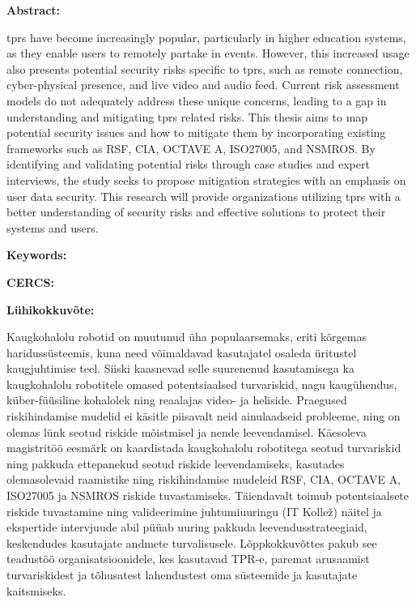 
\newpage
\noindent\textbf{\large {\thesisTitle}}

\vspace*{3ex}

\noindent\textbf{Abstract:}
\vspace{-1ex}

\ac{tprs} have become increasingly popular, particularly
in higher education systems, as they enable users to remotely partake in
events. However, this increased usage also presents potential security risks
specific to \ac{tprs}, such as remote connection, cyber-physical presence, and
live video and audio feed. Current risk assessment models do not adequately
address these unique concerns, leading to a gap in understanding and
mitigating \ac{tprs} related risks.
This thesis aims to map potential security issues and how to mitigate them by incorporating existing
frameworks such as RSF, CIA, OCTAVE A, ISO27005, and NSMROS. By identifying and validating
potential risks through case studies and expert interviews, the study seeks
to propose mitigation strategies with an emphasis on user data security.
This research will provide organizations utilizing \ac{tprs} with a
better understanding of security risks and effective solutions to protect
their systems and users.

\vspace*{1ex}

\noindent\textbf{Keywords:} {\thesisKeywords}

\vspace*{1ex}

\noindent\textbf{CERCS:}

\vspace*{1ex}

\noindent\textbf{\large {\thesisTitleEst}}
\vspace*{1ex}

\noindent\textbf{Lühikokkuvõte:}
\vspace{-1ex}

Kaugkohalolu robotid on muutunud üha populaarsemaks, eriti kõrgemas haridussüsteemis, kuna need võimaldavad kasutajatel osaleda üritustel
kaugjuhtimise teel. Siiski kaasnevad selle suurenenud kasutamisega ka kaugkohalolu robotitele omased potentsiaalsed turvariskid, nagu
kaugühendus, küber-füüsiline kohalolek ning reaalajas video- ja heliside. Praegused riskihindamise mudelid ei käsitle
piisavalt neid ainulaadseid probleeme, ning on olemas lünk seotud riskide mõistmisel ja nende leevendamisel.
Käesoleva magistritöö eesmärk on kaardistada kaugkohalolu robotitega seotud turvariskid ning pakkuda ettepanekud seotud riskide
leevendamiseks, kasutades olemasolevaid raamistike ning riskihindamise mudeleid RSF, CIA, OCTAVE A, ISO27005 ja NSMROS riskide
tuvastamiseks. Täiendavalt toimub potentsiaalsete riskide tuvastamine ning valideerimine juhtumiuuringu (IT Kollež) näitel ja ekspertide
intervjuude abil püüab uuring pakkuda leevendusstrateegiaid, keskendudes kasutajate andmete turvalisusele. Lõppkokkuvõttes pakub see
teadustöö organisatsioonidele, kes kasutavad TPR-e, paremat arusaamist turvariskidest ja tõhusatest lahendustest oma süsteemide ja kasutajate kaitsmiseks.
